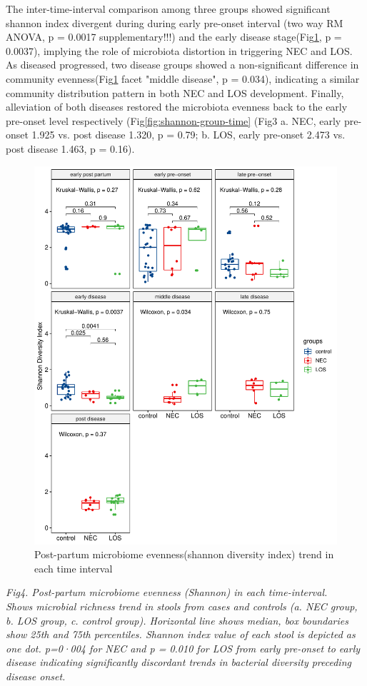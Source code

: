 \documentclass[fleqn,10pt]{wlpeerj} %
\begin{document}
    \noindent
    The inter-time-interval comparison among three groups showed significant shannon index divergent during during early pre-onset interval (two way RM ANOVA, p = 0.0017 supplementary!!!) and the early disease stage(Fig\ref{fig:shannon-time-groups}, p = 0.0037), implying the role of microbiota distortion in triggering NEC and LOS. As diseased progressed, two disease groups showed a non-significant difference in community evenness(Fig\ref{fig:shannon-time-groups} facet "middle disease", p = 0.034), indicating a similar community distribution pattern in both NEC and LOS development. Finally, alleviation of both diseases restored the microbiota evenness back to the early pre-onset level respectively (Fig\ref{fig:shannon-group-time}  (Fig3 a. NEC, early pre-onset 1.925 vs. post disease 1.320, p = 0.79; b. LOS, early pre-onset 2.473 vs. post disease 1.463, p = 0.16).\\
    \begin{figure}[ht]\centering
      \includegraphics[width=\linewidth]{figure/shannon-time-groups.pdf}
      \caption{Post-partum microbiome evenness(shannon diversity index) trend in each time interval}
      \label{fig:shannon-time-groups}
    \end{figure}
    \textit{Fig4. Post-partum microbiome evenness (Shannon) in each time-interval. \\ Shows microbial richness trend in stools from cases and controls (a. NEC group, b. LOS group, c. control group). Horizontal line shows median, box boundaries show 25th and 75th percentiles.  Shannon index value of each stool is depicted as one dot. p=0·004 for NEC and p = 0.010 for LOS from early pre-onset to early disease indicating significantly discordant trends in bacterial diversity preceding disease onset. }
\end{document}
